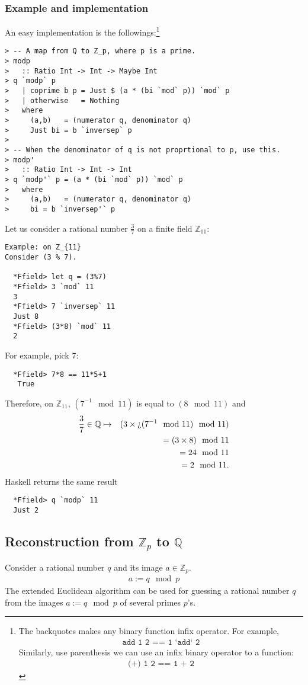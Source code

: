 \documentclass[11pt]{book}
\begin{document}
\subsubsection{Example and implementation}
An easy implementation is the followings:\footnote{
The backquotes makes any binary function infix operator.
For example,
\begin{eqnarray}
\texttt{add 1 2 == 1 `add` 2}
\end{eqnarray}
Similarly, use parenthesis we can use an infix binary operator to a function:
\begin{eqnarray}
\texttt{(+) 1 2 == 1 + 2}
\end{eqnarray}
}
\begin{verbatim}
> -- A map from Q to Z_p, where p is a prime.
> modp 
>   :: Ratio Int -> Int -> Maybe Int
> q `modp` p 
>   | coprime b p = Just $ (a * (bi `mod` p)) `mod` p
>   | otherwise   = Nothing
>   where
>     (a,b)   = (numerator q, denominator q)
>     Just bi = b `inversep` p
>
> -- When the denominator of q is not proprtional to p, use this.
> modp' 
>   :: Ratio Int -> Int -> Int
> q `modp'` p = (a * (bi `mod` p)) `mod` p
>   where
>     (a,b)   = (numerator q, denominator q)
>     bi = b `inversep'` p
\end{verbatim}
Let us consider a rational number $\frac{3}{7}$ on a finite field $\mathbb{Z}_{11}$:
\begin{verbatim}
Example: on Z_{11}
Consider (3 % 7).

  *Ffield> let q = (3%7)
  *Ffield> 3 `mod` 11
  3
  *Ffield> 7 `inversep` 11
  Just 8
  *Ffield> (3*8) `mod` 11
  2
\end{verbatim}
 For example, pick 7:
 \begin{verbatim}  
  *Ffield> 7*8 == 11*5+1
   True
 \end{verbatim}
Therefore, on $\mathbb{Z}_{11}$, $(7^{-1} \mod 11)$ is equal to $(8 \mod 11)$ and
\begin{eqnarray}
\frac{3}{7} \in \mathbb{Q} &\mapsto& (3 \times \text{\textquestiondown}(7^{-1} \mod 11) \mod 11) \\
&&= (3 \times 8) \mod 11 \\
&&= 24 \mod 11 \\
&&= 2 \mod 11.
\end{eqnarray}
Haskell returns the same result
\begin{verbatim}  
  *Ffield> q `modp` 11
  Just 2
\end{verbatim}

\subsection{Reconstruction from $\mathbb{Z}_p$ to $\mathbb{Q}$}
Consider a rational number $q$ and its image $a \in \mathbb{Z}_p$.
\begin{eqnarray}
a := q \mod p
\end{eqnarray}
The extended Euclidean algorithm can be used for guessing a rational number $q$ from the images $a := q \mod p$ of several primes $p$'s.
\end{document}
